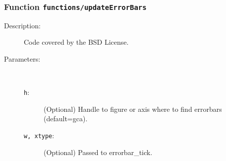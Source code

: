 \subsubsection[Function \texttt{updateErrorBars}]{Function \texttt{functions/updateErrorBars}}%
%
\label{ref_functions__updateErrorBars}%
\hypertarget{ref_functions__updateErrorBars}{}%
\begin{description}
%
%
\item[Description:]%
Code covered by the BSD License.
\item[Parameters:]~
\begin{description}%
\item[\texttt{h}:]
 (Optional) Handle to figure or axis where to find errorbars (default=gca).
\item[\texttt{w, xtype}:]
 (Optional) Passed to errorbar\_tick.
\end{description}%
%
%
%
%
%
\end{description}
\methodline%
